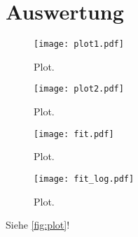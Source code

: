 \section{Auswertung}
\label{sec:Auswertung}

\begin{figure}
  \centering
  \texttt{[image: plot1.pdf]}
  \caption{Plot.}
  \label{fig:plot}
\end{figure}

\begin{figure}
  \centering
  \texttt{[image: plot2.pdf]}
  \caption{Plot.}
  \label{fig:plot}
\end{figure}

\begin{figure}
  \centering
  \texttt{[image: fit.pdf]}
  \caption{Plot.}
  \label{fig:plot}
\end{figure}

\begin{figure}
  \centering
  \texttt{[image: fit\_log.pdf]}
  \caption{Plot.}
  \label{fig:plot}
\end{figure}

Siehe \autoref{fig:plot}!
